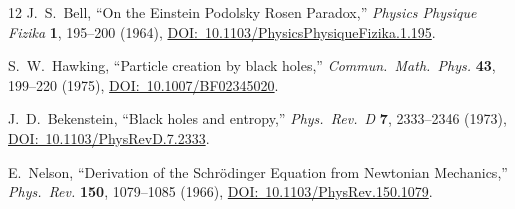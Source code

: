 \documentclass[12pt,a4paper]{article}
\theoremstyle{plain}
\theoremstyle{definition}
\theoremstyle{remark}
\begin{document}
\begin{thebibliography}{12}
J.~S.~Bell,
``On the Einstein Podolsky Rosen Paradox,''
\emph{Physics Physique Fizika} \textbf{1}, 195--200 (1964),
\href{https://doi.org/10.1103/PhysicsPhysiqueFizika.1.195}%
     {DOI:~10.1103/PhysicsPhysiqueFizika.1.195}.

S.~W.~Hawking,
``Particle creation by black holes,''
\emph{Commun.\ Math.\ Phys.} \textbf{43}, 199--220 (1975),
\href{https://doi.org/10.1007/BF02345020}%
     {DOI:~10.1007/BF02345020}.

J.~D.~Bekenstein,
``Black holes and entropy,''
\emph{Phys.\ Rev.\ D} \textbf{7}, 2333--2346 (1973),
\href{https://doi.org/10.1103/PhysRevD.7.2333}%
     {DOI:~10.1103/PhysRevD.7.2333}.

E.~Nelson,
``Derivation of the Schr\"odinger Equation from Newtonian Mechanics,''
\emph{Phys.\ Rev.} \textbf{150}, 1079--1085 (1966),
\href{https://doi.org/10.1103/PhysRev.150.1079}%
     {DOI:~10.1103/PhysRev.150.1079}.

\end{thebibliography}
\end{document}
